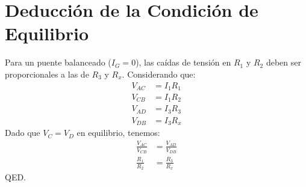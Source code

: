 \documentclass{article}
\begin{document}
\appendix
\section{Deducción de la Condición de Equilibrio}
Para un puente balanceado ($I_G = 0$), las caídas de tensión en $R_1$ y $R_2$ deben ser proporcionales a las de $R_3$ y $R_x$. Considerando que:
\begin{align*}
V_{AC} &= I_1 R_1 \\
V_{CB} &= I_1 R_2 \\
V_{AD} &= I_3 R_3 \\
V_{DB} &= I_3 R_x
\end{align*}
Dado que $V_C = V_D$ en equilibrio, tenemos:
\begin{align*}
\frac{V_{AC}}{V_{CB}} &= \frac{V_{AD}}{V_{DB}} \\
\frac{R_1}{R_2} &= \frac{R_3}{R_x}
\end{align*}
QED.
\end{document}
